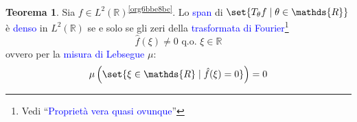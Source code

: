\documentclass[10pt]{book}
\newcommand{\1}{\mathds{1}}
\newcommand{\R}{\mathds{R}}
\theoremstyle{definition}%
\newtheorem{thm}{Teorema}[section]
\theoremstyle{plain}
\theoremstyle{remark}
\renewcommand{\href}[2]{\textcolor{blue}{#2}}
\begin{document}
\begin{thm}
Sia \(f \in L^{2}(\R)\)\textsuperscript{\ref{org6bbe8bc}}. Lo \href{../../../../../org/roam/20250630122400-span.org}{span} di \(\set{T_{\theta}f\mid \theta \in \R}\) è \href{../../../../../org/roam/20250301193045-sottoinsieme_denso.org}{denso} in \(L^{2}(\R)\) se e solo se gli zeri della \href{../../../../../org/roam/20250630121906-trasformata_di_fourier.org}{trasformata di Fourier}\footnote{Vedi ``\href{../../../../../org/roam/20250630122745-proprieta_vera_quasi_ovunque.org}{Proprietà vera quasi ovunque}''}
\begin{equation*}
\hat{f}(\xi) \neq 0\text{ q.o. }\xi \in \R
\end{equation*}
ovvero per la \href{../../../../../org/roam/20250630122824-misura_di_lebesgue.org}{misura di Lebsegue} \(\mu\):
\begin{equation*}
\mu\left(\set{\xi \in \R\mid \hat{f}(\xi) = 0}\right) = 0
\end{equation*}
\label{teo:wt2}
\end{thm}
\end{document}
